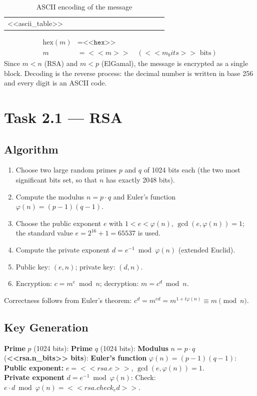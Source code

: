 \documentclass[12pt,a4paper]{article}
\begin{document}
\begin{table}[H]
\centering
\caption{ASCII encoding of the message}
\small
\setlength{\tabcolsep}{3pt}
\begin{tabular}{l*{14}{c}}
\toprule
<<ascii_table>>
\bottomrule
\end{tabular}
\end{table}

\begin{align*}
  \text{hex}(m) &= \texttt{<<hex>>}\\
  m &= <<m>> \quad (<<m_bits>>\text{ bits})
\end{align*}
Since $m < n$ (RSA) and $m < p$ (ElGamal), the message is encrypted as a single block. Decoding is
the reverse process: the decimal number is written in base 256 and every digit is an ASCII code.

\section{Task 2.1 — RSA}
\subsection{Algorithm}
\begin{enumerate}
  \item Choose two large random primes $p$ and $q$ of 1024 bits each (the two most significant
        bits set, so that $n$ has exactly 2048 bits).
  \item Compute the modulus $n = p\cdot q$ and Euler's function $\varphi(n)=(p-1)(q-1)$.
  \item Choose the public exponent $e$ with $1<e<\varphi(n)$, $\gcd(e,\varphi(n))=1$; the
        standard value $e = 2^{16}+1 = 65537$ is used.
  \item Compute the private exponent $d = e^{-1} \bmod \varphi(n)$ (extended Euclid).
  \item Public key: $(e,n)$; private key: $(d,n)$.
  \item Encryption: $c = m^{e} \bmod n$; decryption: $m = c^{d} \bmod n$.
\end{enumerate}
Correctness follows from Euler's theorem: $c^d = m^{ed} = m^{1+t\varphi(n)} \equiv m \pmod n$.

\subsection{Key Generation}
\noindent\textbf{Prime} $p$ (1024 bits):
\noindent\textbf{Prime} $q$ (1024 bits):
\noindent\textbf{Modulus} $n=p\cdot q$ (\textbf{<<rsa.n_bits>> bits}):
\noindent\textbf{Euler's function} $\varphi(n)=(p-1)(q-1)$:
\noindent\textbf{Public exponent:} $e = <<rsa.e>>$, \quad $\gcd(e,\varphi(n)) = 1$.\\[4pt]
\noindent\textbf{Private exponent} $d = e^{-1} \bmod \varphi(n)$:
Check: $e\cdot d \bmod \varphi(n) = <<rsa.check_ed>>$.
\end{document}
